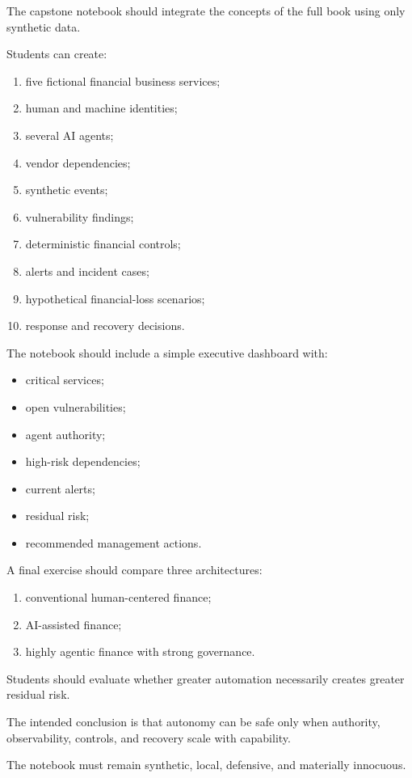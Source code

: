 \begin{notebooklab}
The capstone notebook should integrate the concepts of the full book using only synthetic data.

Students can create:
\begin{enumerate}
    \item five fictional financial business services;
    \item human and machine identities;
    \item several AI agents;
    \item vendor dependencies;
    \item synthetic events;
    \item vulnerability findings;
    \item deterministic financial controls;
    \item alerts and incident cases;
    \item hypothetical financial-loss scenarios;
    \item response and recovery decisions.
\end{enumerate}

The notebook should include a simple executive dashboard with:
\begin{itemize}
    \item critical services;
    \item open vulnerabilities;
    \item agent authority;
    \item high-risk dependencies;
    \item current alerts;
    \item residual risk;
    \item recommended management actions.
\end{itemize}

A final exercise should compare three architectures:
\begin{enumerate}
    \item conventional human-centered finance;
    \item AI-assisted finance;
    \item highly agentic finance with strong governance.
\end{enumerate}

Students should evaluate whether greater automation necessarily creates greater residual risk.

The intended conclusion is that autonomy can be safe only when authority, observability, controls, and recovery scale with capability.

The notebook must remain synthetic, local, defensive, and materially innocuous.
\end{notebooklab}

